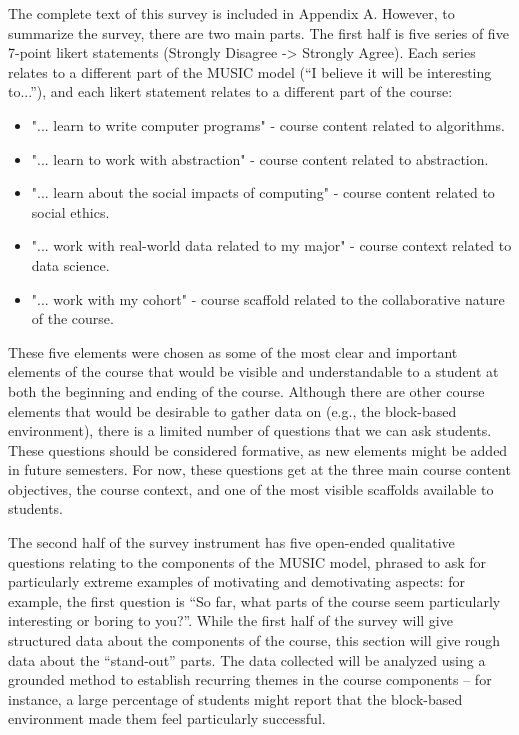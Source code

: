     The complete text of this survey is included in Appendix A. However, to summarize the survey, there are two main parts.
    The first half is five series of five 7-point likert statements (Strongly Disagree -> Strongly Agree). Each series relates to a different part of the MUSIC model (``I believe it will be interesting to...''), and each likert statement relates to a different part of the course:
    \begin{itemize}
    \item "... learn to write computer programs" - course content related to algorithms.
    \item "... learn to work with abstraction" - course content related to abstraction.
    \item "... learn about the social impacts of computing" - course content related to social ethics.
    \item "... work with real-world data related to my major" - course context related to data science.
    \item "... work with my cohort" - course scaffold related to the collaborative nature of the course.
    \end{itemize}
    
    These five elements were chosen as some of the most clear and important elements of the course that would be visible and understandable to a student at both the beginning and ending of the course.
    Although there are other course elements that would be desirable to gather data on (e.g., the block-based environment), there is a limited number of questions that we can ask students. 
    These questions should be considered formative, as new elements might be added in future semesters.
    For now, these questions get at the three main course content objectives, the course context, and one of the most visible scaffolds available to students.
    
    The second half of the survey instrument has five open-ended qualitative questions relating to the components of the MUSIC model, phrased to ask for particularly extreme examples of motivating and demotivating aspects: for example, the first question is ``So far, what parts of the course seem particularly interesting or boring to you?''. While the first half of the survey will give structured data about the components of the course, this section will give rough data about the ``stand-out'' parts. The data collected will be analyzed using a grounded method to establish recurring themes in the course components -- for instance, a large percentage of students might report that the block-based environment made them feel particularly successful.
    
